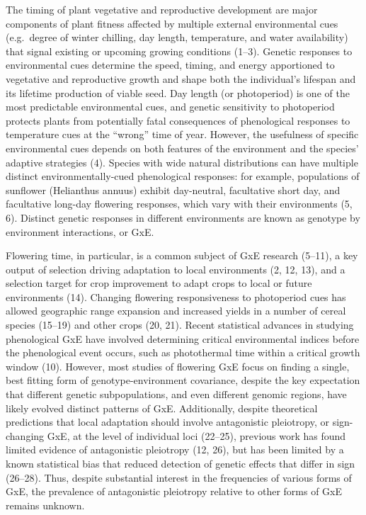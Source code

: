 \documentclass[
  9pt,
  twocolumn,
  twoside]{pnas-new}
\begin{document}
The timing of plant vegetative and reproductive development are major
components of plant fitness affected by multiple external environmental
cues (e.g.~degree of winter chilling, day length, temperature, and water
availability) that signal existing or upcoming growing conditions
(1--3). Genetic responses to environmental cues determine the speed,
timing, and energy apportioned to vegetative and reproductive growth and
shape both the individual's lifespan and its lifetime production of
viable seed. Day length (or photoperiod) is one of the most predictable
environmental cues, and genetic sensitivity to photoperiod protects
plants from potentially fatal consequences of phenological responses to
temperature cues at the ``wrong'' time of year. However, the usefulness
of specific environmental cues depends on both features of the
environment and the species' adaptive strategies (4). Species with wide
natural distributions can have multiple distinct environmentally-cued
phenological responses: for example, populations of sunflower
(Helianthus annuus) exhibit day-neutral, facultative short day, and
facultative long-day flowering responses, which vary with their
environments (5, 6). Distinct genetic responses in different
environments are known as genotype by environment interactions, or GxE.

Flowering time, in particular, is a common subject of GxE research
(5--11), a key output of selection driving adaptation to local
environments (2, 12, 13), and a selection target for crop improvement to
adapt crops to local or future environments (14). Changing flowering
responsiveness to photoperiod cues has allowed geographic range
expansion and increased yields in a number of cereal species (15--19)
and other crops (20, 21). Recent statistical advances in studying
phenological GxE have involved determining critical environmental
indices before the phenological event occurs, such as photothermal time
within a critical growth window (10). However, most studies of flowering
GxE focus on finding a single, best fitting form of genotype-environment
covariance, despite the key expectation that different genetic
subpopulations, and even different genomic regions, have likely evolved
distinct patterns of GxE. Additionally, despite theoretical predictions
that local adaptation should involve antagonistic pleiotropy, or
sign-changing GxE, at the level of individual loci (22--25), previous
work has found limited evidence of antagonistic pleiotropy (12, 26), but
has been limited by a known statistical bias that reduced detection of
genetic effects that differ in sign (26--28). Thus, despite substantial
interest in the frequencies of various forms of GxE, the prevalence of
antagonistic pleiotropy relative to other forms of GxE remains unknown.
\end{document}
